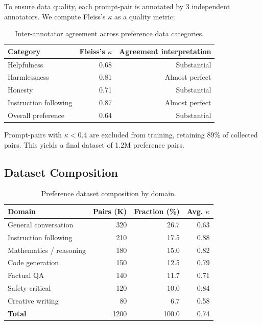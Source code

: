 \documentclass[11pt,a4paper]{article}
\begin{document}
To ensure data quality, each prompt-pair is annotated by 3 independent annotators.
We compute Fleiss's $\kappa$ as a quality metric:

\begin{table}[H]
\centering
\caption{Inter-annotator agreement across preference data categories.}
\begin{tabular}{lrr}
\toprule
\textbf{Category} & \textbf{Fleiss's $\kappa$} & \textbf{Agreement interpretation} \\
\midrule
Helpfulness            & 0.68 & Substantial \\
Harmlessness           & 0.81 & Almost perfect \\
Honesty                & 0.71 & Substantial \\
Instruction following  & 0.87 & Almost perfect \\
Overall preference     & 0.64 & Substantial \\
\bottomrule
\end{tabular}
\label{tab:agreement}
\end{table}

Prompt-pairs with $\kappa < 0.4$ are excluded from training, retaining 89\% of
collected pairs. This yields a final dataset of 1.2M preference pairs.

\subsection{Dataset Composition}

\begin{table}[H]
\centering
\caption{Preference dataset composition by domain.}
\begin{tabular}{lrrr}
\toprule
\textbf{Domain} & \textbf{Pairs (K)} & \textbf{Fraction (\%)} & \textbf{Avg. $\kappa$} \\
\midrule
General conversation     & 320 & 26.7 & 0.63 \\
Instruction following    & 210 & 17.5 & 0.88 \\
Mathematics / reasoning  & 180 & 15.0 & 0.82 \\
Code generation          & 150 & 12.5 & 0.79 \\
Factual QA               & 140 & 11.7 & 0.71 \\
Safety-critical          & 120 & 10.0 & 0.84 \\
Creative writing         & 80  & 6.7  & 0.58 \\
\midrule
\textbf{Total}           & 1200 & 100.0 & 0.74 \\
\bottomrule
\end{tabular}
\label{tab:dataset}
\end{table}
\end{document}
